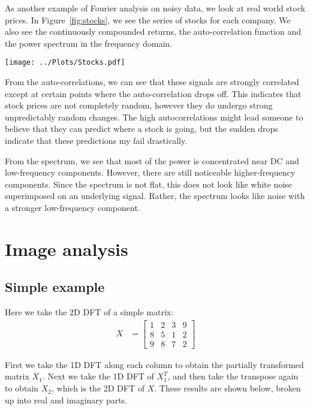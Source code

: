 \documentclass[twocolumn]{myarticle}
\begin{document}
As another example of Fourier analysis on noisy data, we look at real world stock prices.
In Figure~\ref{fig:stocks}, we see the series of stocks for each company.
We also see the continuously compounded returns, the auto-correlation function and the power spectrum in the frequency domain.

\begin{figure*}[htb]
    \centering
    \texttt{[image: ../Plots/Stocks.pdf]}
    \caption{Analysis of real world stock prices.}
    \label{fig:stocks}
\end{figure*}

From the auto-correlations, we can see that these signals are strongly correlated except at certain points where the auto-correlation drops off.
This indicates that stock prices are not completely random, however they do undergo strong unpredictably random changes.
The high autocorrelations might lead someone to believe that they can predict where a stock is going, but the sudden drops indicate that these predictions my fail drastically.

From the spectrum, we see that most of the power is concentrated near DC and low-frequency components.
However, there are still noticeable higher-frequency components.
Since the spectrum is not flat, this does not look like white noise superimposed on an underlying signal.
Rather, the spectrum looks like noise with a stronger low-frequency component.

\section{Image analysis}
\label{sec:image_analysis}

\subsection{Simple example}
\label{subsec:simple_example}

Here we take the 2D DFT of a simple matrix:
\begin{align}
    X &= \begin{bmatrix} 1 & 2 & 3 & 9 \\ 8 & 5 & 1 & 2 \\ 9 & 8 & 7 & 2 \end{bmatrix}
\end{align}

First we take the 1D DFT along each column to obtain the partially transformed matrix $ X_1 $.
Next we take the 1D DFT of $ X_1^T $, and then take the transpose again to obtain $ X_2 $, which is the 2D DFT of $ X $.
These results are shown below, broken up into real and imaginary parts.
\end{document}
